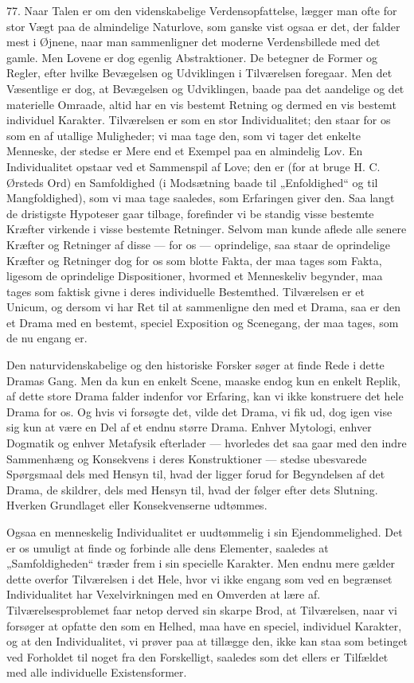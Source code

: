 \documentclass[12pt,a4paper,openany]{book}
\newcommand{\opage}[1]{\marginnote{\footnotesize\textit{[#1]}}}
\begin{document}
77. Naar Talen er om den videnskabelige Verdensopfattelse, lægger man
ofte for stor Vægt paa de almindelige Naturlove, som ganske vist ogsaa
er det, der falder mest i Øjnene, naar man sammenligner det moderne
Verdensbillede med det gamle. Men Lovene er dog egenlig Abstraktioner.
De betegner de Former og Regler, efter hvilke Bevægelsen og Udviklingen
i Tilværelsen foregaar. Men det Væsentlige er dog, at Bevægelsen og
Udviklingen, baade paa det aandelige og det materielle Omraade, altid
har en vis bestemt Retning og dermed en vis bestemt individuel Karakter.
Tilværelsen er som en stor Individualitet; den staar for os som en af
utallige Muligheder; vi maa tage den, som vi tager det enkelte Menneske,
der stedse er Mere end et Exempel paa en almindelig Lov. En
Individualitet opstaar ved et Sammenspil af Love; den er (for at bruge
H. C. Ørsteds Ord) en Samfoldighed (i Modsætning baade til „Enfoldighed“
og til Mangfoldighed), som vi maa tage saaledes, som Erfaringen giver
den. Saa langt de dristigste Hypoteser gaar tilbage, forefinder vi be%
\opage{179}standig visse bestemte Kræfter virkende i visse bestemte
Retninger. Selvom man kunde aflede alle senere Kræfter og Retninger af
disse --- for os --- oprindelige, saa staar de oprindelige Kræfter og
Retninger dog for os som blotte Fakta, der maa tages som Fakta, ligesom
de oprindelige Dispositioner, hvormed et Menneskeliv begynder, maa tages
som faktisk givne i deres individuelle Bestemthed. Tilværelsen er et
Unicum, og dersom vi har Ret til at sammenligne den med et Drama, saa er
den et Drama med en bestemt, speciel Exposition og Scenegang, der maa
tages, som de nu engang er.

Den naturvidenskabelige og den historiske Forsker søger at finde Rede i
dette Dramas Gang. Men da kun en enkelt Scene, maaske endog kun en
enkelt Replik, af dette store Drama falder indenfor vor Erfaring, kan vi
ikke konstruere det hele Drama for os. Og hvis vi forsøgte det, vilde
det Drama, vi fik ud, dog igen vise sig kun at være en Del af et endnu
større Drama. Enhver Mytologi, enhver Dogmatik og enhver Metafysik
efterlader --- hvorledes det saa gaar med den indre Sammenhæng og
Konsekvens i deres Konstruktioner --- stedse ubesvarede Spørgsmaal dels
med Hensyn til, hvad der ligger forud for Begyndelsen af det Drama, de
skildrer, dels med Hensyn til, hvad der følger efter dets Slutning.
Hverken Grundlaget eller Konsekvenserne udtømmes.

Ogsaa en menneskelig Individualitet er uudtømmelig i sin
Ejendommelighed. Det er os umuligt at finde og forbinde alle dens
Elementer, saaledes at „Samfoldigheden“ træder frem i sin specielle
Karakter. Men endnu mere gælder dette overfor Tilværelsen i det Hele,
hvor vi ikke engang som ved en begrænset Individualitet har
Vexelvirkningen med en Omverden at lære af. Tilværelsesproblemet faar
netop derved sin skarpe Brod, at Tilværelsen, naar vi forsøger at
opfatte den som en Helhed, maa have en speciel, individuel Karakter, og
at den Individualitet, vi prøver paa at tillægge den, ikke kan staa som
betinget ved Forholdet til noget fra den Forskelligt, saaledes som det
ellers er Tilfældet med alle individuelle Existensformer.
\end{document}
